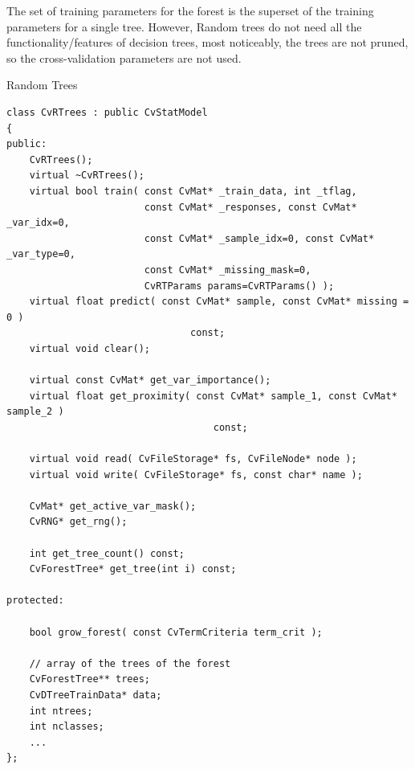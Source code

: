 \begin{description}
\end{description}

The set of training parameters for the forest is the superset of the training parameters for a single tree. However, Random trees do not need all the functionality/features of decision trees, most noticeably, the trees are not pruned, so the cross-validation parameters are not used.



Random Trees

\begin{lstlisting}
class CvRTrees : public CvStatModel
{
public:
    CvRTrees();
    virtual ~CvRTrees();
    virtual bool train( const CvMat* _train_data, int _tflag,
                        const CvMat* _responses, const CvMat* _var_idx=0,
                        const CvMat* _sample_idx=0, const CvMat* _var_type=0,
                        const CvMat* _missing_mask=0,
                        CvRTParams params=CvRTParams() );
    virtual float predict( const CvMat* sample, const CvMat* missing = 0 ) 
								const;
    virtual void clear();

    virtual const CvMat* get_var_importance();
    virtual float get_proximity( const CvMat* sample_1, const CvMat* sample_2 ) 
									const;

    virtual void read( CvFileStorage* fs, CvFileNode* node );
    virtual void write( CvFileStorage* fs, const char* name );

    CvMat* get_active_var_mask();
    CvRNG* get_rng();

    int get_tree_count() const;
    CvForestTree* get_tree(int i) const;

protected:

    bool grow_forest( const CvTermCriteria term_crit );

    // array of the trees of the forest
    CvForestTree** trees;
    CvDTreeTrainData* data;
    int ntrees;
    int nclasses;
    ...
};

\end{lstlisting}


